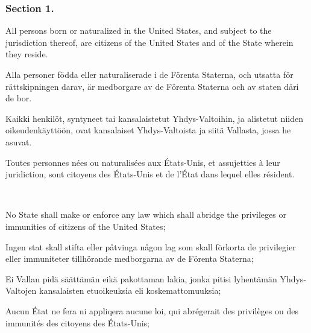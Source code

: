 \documentclass[a4paper,landscape,12pt]{article}
\begin{document}
\subsubsection*{Section 1.}
\begin{minipage}[t]{0.22\textwidth}
All persons born or naturalized in the United States, and subject to the jurisdiction thereof, are citizens of the United States and of the State wherein they reside.
\end{minipage}\textwidth
\begin{minipage}[t]{0.22\textwidth}
Alla personer födda eller naturaliserade i de Förenta Staterna, och utsatta för rättskipningen darav, är medborgare av de Förenta Staterna och av staten däri de bor.
\end{minipage}\textwidth
\begin{minipage}[t]{0.22\textwidth}
Kaikki henkilöt, syntyneet tai kansalaistetut Yhdys-Valtoihin, ja alistetut niiden oikeudenkäyttöön, ovat kansalaiset Yhdys-Valtoista ja siitä Vallasta, jossa he asuvat.
\end{minipage}\textwidth
\begin{minipage}[t]{0.22\textwidth}
Toutes personnes nées ou naturalisées aux États-Unis, et assujetties à leur juridiction, sont citoyens des États-Unis et de l'État dans lequel elles résident.
\end{minipage}

~

\begin{minipage}[t]{0.22\textwidth}
No State shall make or enforce any law which shall abridge the privileges or immunities of citizens of the United States;
\end{minipage}\textwidth
\begin{minipage}[t]{0.22\textwidth}
Ingen stat skall stifta eller påtvinga någon lag som skall förkorta de privilegier eller immuniteter tillhörande medborgarna av de Förenta Staterna;
\end{minipage}\textwidth
\begin{minipage}[t]{0.22\textwidth}
Ei Vallan pidä säättämän eikä pakottaman lakia, jonka pitisi lyhentämän Yhdys-Valtojen kansalaisten etuoikeuksia eli koskemattomuuksia;
\end{minipage}\textwidth
\begin{minipage}[t]{0.22\textwidth}
Aucun État ne fera ni appliqera aucune loi, qui abrégerait des privilèges ou des immunités des citoyens des États-Unis; 
	\end{minipage}
\end{document}
